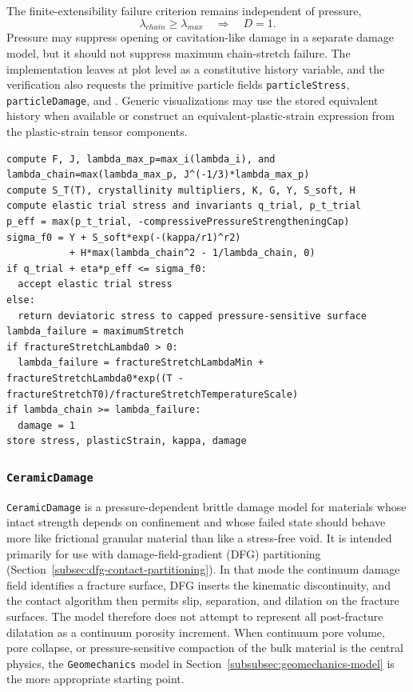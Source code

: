 The finite-extensibility failure criterion remains independent of pressure,
\begin{equation}
  \lambda_{chain}\ge \lambda_{max}\quad\Rightarrow\quad D=1.
  \label{eq:surface-polymer-maximum-stretch-failure}
\end{equation}
Pressure may suppress opening or cavitation-like damage in a separate damage model, but it should not suppress maximum chain-stretch failure.  The implementation leaves  at plot level as a constitutive history variable, and the verification also requests the primitive particle fields \texttt{particleStress}, \texttt{particleDamage}, and .  Generic visualizations may use the stored equivalent history when available or construct an equivalent-plastic-strain expression from the plastic-strain tensor components.

\begin{lstlisting}[caption={SurfaceInformedPolymer update structure.},label={alg:surface-informed-polymer-update},basicstyle=\ttfamily\small]
compute F, J, lambda_max_p=max_i(lambda_i), and lambda_chain=max(lambda_max_p, J^(-1/3)*lambda_max_p)
compute S_T(T), crystallinity multipliers, K, G, Y, S_soft, H
compute elastic trial stress and invariants q_trial, p_t_trial
p_eff = max(p_t_trial, -compressivePressureStrengtheningCap)
sigma_f0 = Y + S_soft*exp(-(kappa/r1)^r2)
           + H*max(lambda_chain^2 - 1/lambda_chain, 0)
if q_trial + eta*p_eff <= sigma_f0:
  accept elastic trial stress
else:
  return deviatoric stress to capped pressure-sensitive surface
lambda_failure = maximumStretch
if fractureStretchLambda0 > 0:
  lambda_failure = fractureStretchLambdaMin + fractureStretchLambda0*exp((T - fractureStretchT0)/fractureStretchTemperatureScale)
if lambda_chain >= lambda_failure:
  damage = 1
store stress, plasticStrain, kappa, damage
\end{lstlisting}

\subsubsection{\texttt{CeramicDamage}}
\label{subsubsec:ceramic-damage-model}

\texttt{CeramicDamage} is a pressure-dependent brittle damage model for materials whose intact strength depends on confinement and whose failed state should behave more like frictional granular material than like a stress-free void.  It is intended primarily for use with damage-field-gradient (DFG) partitioning (Section~\ref{subsec:dfg-contact-partitioning}).  In that mode the continuum damage field identifies a fracture surface, DFG inserts the kinematic discontinuity, and the contact algorithm then permits slip, separation, and dilation on the fracture surfaces.  The model therefore does not attempt to represent all post-fracture dilatation as a continuum porosity increment.  When continuum pore volume, pore collapse, or pressure-sensitive compaction of the bulk material is the central physics, the \texttt{Geomechanics} model in Section~\ref{subsubsec:geomechanics-model} is the more appropriate starting point.

